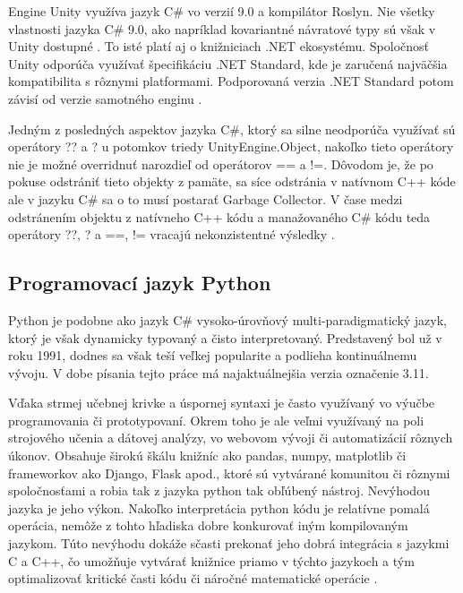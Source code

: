 \documentclass[slovak, master]{diploma}
\begin{document}
Engine Unity využíva jazyk C\# vo verzií 9.0 a kompilátor Roslyn. Nie všetky vlastnosti jazyka C\# 9.0, ako napríklad kovariantné návratové typy sú však v Unity dostupné \cite{compiler}. To isté platí aj o knižniciach .NET ekosystému. Spoločnosť Unity odporúča využívať špecifikáciu .NET Standard, kde je zaručená najväčšia kompatibilita s rôznymi platformami. Podporovaná verzia .NET Standard potom závisí od verzie samotného enginu \cite{netUnity}. 

Jedným z posledných aspektov jazyka C\#, ktorý sa silne neodporúča využívať sú operátory ?? a ? u potomkov triedy UnityEngine.Object, nakoľko tieto operátory nie je možné overridnuť narozdieľ od operátorov == a !=. Dôvodom je, že po pokuse odstrániť tieto objekty z pamäte, sa síce odstránia v natívnom C++ kóde ale v jazyku C\# sa o to musí postarať Garbage Collector. V čase medzi odstránením objektu z natívneho C++ kódu a manažovaného C\# kódu teda operátory ??, ? a ==, != vracajú nekonzistentné výsledky \cite{netUnity}.

\subsection{Programovací jazyk Python}
\label{sec:langsPython}
Python je podobne ako jazyk C\# vysoko-úrovňový multi-paradigmatický jazyk, ktorý je však dynamicky typovaný a čisto interpretovaný. Predstavený bol už v roku 1991, dodnes sa však teší veľkej popularite a podlieha kontinuálnemu vývoju. V dobe písania tejto práce má najaktuálnejšia verzia označenie 3.11. 

Vďaka strmej učebnej krivke a úspornej syntaxi je často využívaný vo výučbe programovania či prototypovaní. Okrem toho je ale veľmi využívaný na poli strojového učenia a dátovej analýzy, vo webovom vývoji či automatizácií rôznych úkonov. Obsahuje širokú škálu knižníc ako pandas, numpy, matplotlib či frameworkov ako Django, Flask apod., ktoré sú vytvárané komunitou či rôznymi spoločnosťami a robia tak z jazyka python tak obľúbený nástroj. Nevýhodou jazyka je jeho výkon. Nakoľko interpretácia python kódu je relatívne pomalá operácia, nemôže z tohto hľadiska dobre konkurovať iným kompilovaným jazykom. Túto nevýhodu dokáže sčasti prekonať jeho dobrá integrácia s jazykmi C a C++, čo umožňuje vytvárať knižnice priamo v týchto jazykoch a tým optimalizovať kritické časti kódu či náročné matematické operácie \cite{pajton}.
\end{document}
